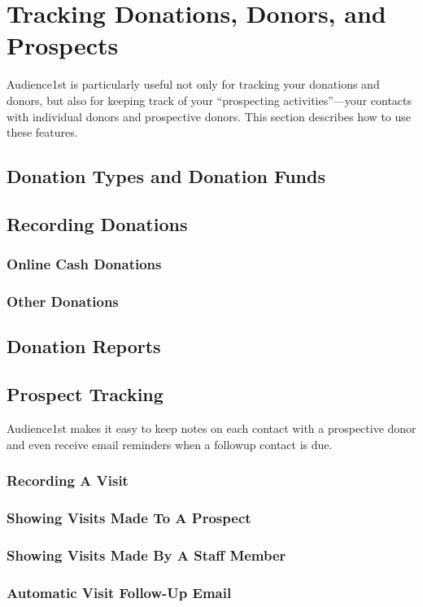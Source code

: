 
\section{Tracking Donations, Donors, and Prospects}
\label{sec:donor}

Audience1st is particularly useful not only for tracking your donations
and donors, but also for keeping track of your ``prospecting
activities''---your contacts with individual donors and prospective
donors.  This section describes how to use these features.

\subsection{Donation Types and Donation Funds}
\label{sec:donation_types_and_Funds}

\subsection{Recording Donations}
\label{sec:recording_donations}



\subsubsection{Online Cash Donations}
\label{sec:online_donations}


\subsubsection{Other Donations}
\label{sec:other_donations}


\subsection{Donation Reports}
\label{sec:donation_search}

\subsection{Prospect Tracking}
\label{sec:prospect_tracking}

Audience1st makes it easy to keep notes on each contact with a
prospective donor and even receive email reminders when a followup
contact is due.

\subsubsection{Recording A Visit}
\label{sec:prospect_visit}

\subsubsection{Showing Visits Made To A Prospect}

\subsubsection{Showing Visits Made By A Staff Member}

\subsubsection{Automatic Visit Follow-Up Email}

